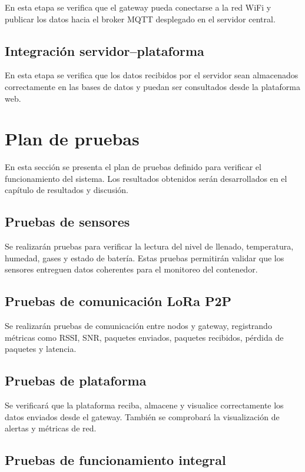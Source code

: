 En esta etapa se verifica que el gateway pueda conectarse a la red WiFi y publicar los datos hacia el broker MQTT desplegado en el servidor central.

\subsection{Integración servidor--plataforma}

En esta etapa se verifica que los datos recibidos por el servidor sean almacenados correctamente en las bases de datos y puedan ser consultados desde la plataforma web.

\section{Plan de pruebas}

En esta sección se presenta el plan de pruebas definido para verificar el funcionamiento del sistema. Los resultados obtenidos serán desarrollados en el capítulo de resultados y discusión.

\subsection{Pruebas de sensores}

Se realizarán pruebas para verificar la lectura del nivel de llenado, temperatura, humedad, gases y estado de batería. Estas pruebas permitirán validar que los sensores entreguen datos coherentes para el monitoreo del contenedor.

\subsection{Pruebas de comunicación LoRa P2P}

Se realizarán pruebas de comunicación entre nodos y gateway, registrando métricas como RSSI, SNR, paquetes enviados, paquetes recibidos, pérdida de paquetes y latencia.

\subsection{Pruebas de plataforma}

Se verificará que la plataforma reciba, almacene y visualice correctamente los datos enviados desde el gateway. También se comprobará la visualización de alertas y métricas de red.

\subsection{Pruebas de funcionamiento integral}

